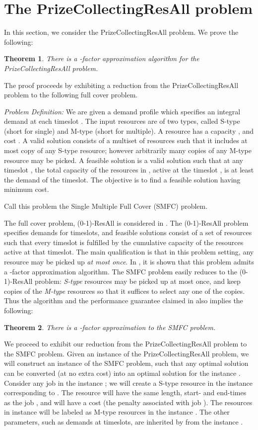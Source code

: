 \documentclass[11pt]{article}
\newtheorem{theorem}{Theorem}
\newcommand{\ZeroOneResAll} {{\sc (0-1)-ResAll}}
\newcommand{\PCResAll}{{\sc PrizeCollectingResAll}}
\newcommand{\smfc}{{\sc SMFC}}
\begin{document}
\section{The {\PCResAll} problem}
\label{app:pcresall}
In this section, we consider the {\PCResAll} problem. We prove the following:

\begin{theorem}
\label{DDD}
There is a -factor approximation algorithm for the {\PCResAll} problem. 
\end{theorem}
The proof proceeds by exhibiting a reduction from the {\PCResAll} problem to 
the following full cover problem.

\noindent
{\it  Problem Definition:} We are given a demand profile which specifies an integral demand  at each timeslot .
The input resources are of two types, called S-type (short for single) and M-type (short for multiple).  
A resource  has 
a capacity , and cost . A valid solution consists of a multiset of resources such that
it includes at most  copy of any S-type resource; however arbitrarily many copies of any M-type resource may be picked. A feasible solution  is a valid solution such that at any timeslot , the total 
capacity of the resources in , active at the timeslot , is at least the demand  of the timeslot.
The objective is to find a feasible solution having minimum cost. 

Call this problem the Single Multiple Full Cover ({\smfc}) problem.

The full cover problem, {\ZeroOneResAll} is considered in \cite{esa2011}. 
The {\ZeroOneResAll} problem specifies demands for 
timeslots, and feasible solutions consist of a set of resources such that every timeslot is 
fulfilled by the cumulative capacity of the resources active at that timeslot. The main 
qualification is that in this problem setting, any resource may be picked up {\em at most
once}. In \cite{esa2011},  it is shown that this problem admits a -factor
approximation algorithm. The {\smfc} problem easily reduces to the {\ZeroOneResAll} problem:
{\em S-type} resources may be picked up at most once, and keep copies of the {\em M-type}
resources so that it suffices to select any one of the copies. 
Thus the algorithm and the performance guarantee claimed in \cite{esa2011} also implies the following:
\begin{theorem}\label{EEE}
There is a -factor approximation to the {\smfc} problem. 
\end{theorem} 

We proceed to exhibit our reduction from the {\PCResAll} problem to the {\smfc} problem. 
Given an instance  of the {\PCResAll} problem, we will construct an instance  of the 
{\smfc} problem, such that any optimal solution  can be converted (at no extra
cost) into an optimal solution  for the instance . Consider any job 
in the instance ; we will create a S-type resource  in the instance  corresponding to
. The resource  will have the same length, start- and end-times as the job , and will 
have a cost  (the penalty associated with job ). The resources in instance  
will be labeled as M-type resources in the instance . The other parameters, such as 
demands at timeslots, are inherited by  from the instance . 
\end{document}
